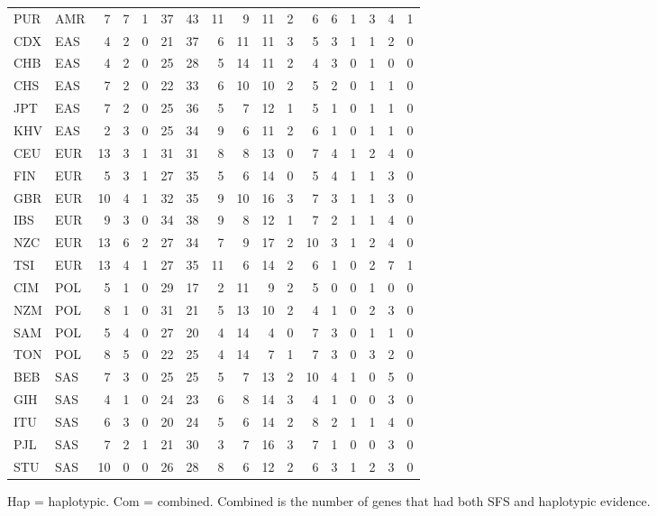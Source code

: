 \documentclass[]{report}
\begin{document}
\begin{table}[!h]
\begin{threeparttable}
\begin{tabular}[t]{llrrrrrrrrrrrrrrr}
PUR & AMR & 7 & 7 & 1 & 37 & 43 & 11 & 9 & 11 & 2 & 6 & 6 & 1 & 3 & 4 & 1\\
CDX & EAS & 4 & 2 & 0 & 21 & 37 & 6 & 11 & 11 & 3 & 5 & 3 & 1 & 1 & 2 & 0\\
CHB & EAS & 4 & 2 & 0 & 25 & 28 & 5 & 14 & 11 & 2 & 4 & 3 & 0 & 1 & 0 & 0\\
CHS & EAS & 7 & 2 & 0 & 22 & 33 & 6 & 10 & 10 & 2 & 5 & 2 & 0 & 1 & 1 & 0\\
JPT & EAS & 7 & 2 & 0 & 25 & 36 & 5 & 7 & 12 & 1 & 5 & 1 & 0 & 1 & 1 & 0\\
KHV & EAS & 2 & 3 & 0 & 25 & 34 & 9 & 6 & 11 & 2 & 6 & 1 & 0 & 1 & 1 & 0\\
CEU & EUR & 13 & 3 & 1 & 31 & 31 & 8 & 8 & 13 & 0 & 7 & 4 & 1 & 2 & 4 & 0\\
FIN & EUR & 5 & 3 & 1 & 27 & 35 & 5 & 6 & 14 & 0 & 5 & 4 & 1 & 1 & 3 & 0\\
GBR & EUR & 10 & 4 & 1 & 32 & 35 & 9 & 10 & 16 & 3 & 7 & 3 & 1 & 1 & 3 & 0\\
IBS & EUR & 9 & 3 & 0 & 34 & 38 & 9 & 8 & 12 & 1 & 7 & 2 & 1 & 1 & 4 & 0\\
NZC & EUR & 13 & 6 & 2 & 27 & 34 & 7 & 9 & 17 & 2 & 10 & 3 & 1 & 2 & 4 & 0\\
TSI & EUR & 13 & 4 & 1 & 27 & 35 & 11 & 6 & 14 & 2 & 6 & 1 & 0 & 2 & 7 & 1\\
CIM & POL & 5 & 1 & 0 & 29 & 17 & 2 & 11 & 9 & 2 & 5 & 0 & 0 & 1 & 0 & 0\\
NZM & POL & 8 & 1 & 0 & 31 & 21 & 5 & 13 & 10 & 2 & 4 & 1 & 0 & 2 & 3 & 0\\
SAM & POL & 5 & 4 & 0 & 27 & 20 & 4 & 14 & 4 & 0 & 7 & 3 & 0 & 1 & 1 & 0\\
TON & POL & 8 & 5 & 0 & 22 & 25 & 4 & 14 & 7 & 1 & 7 & 3 & 0 & 3 & 2 & 0\\
BEB & SAS & 7 & 3 & 0 & 25 & 25 & 5 & 7 & 13 & 2 & 10 & 4 & 1 & 0 & 5 & 0\\
GIH & SAS & 4 & 1 & 0 & 24 & 23 & 6 & 8 & 14 & 3 & 4 & 1 & 0 & 0 & 3 & 0\\
ITU & SAS & 6 & 3 & 0 & 20 & 24 & 5 & 6 & 14 & 2 & 8 & 2 & 1 & 1 & 4 & 0\\
PJL & SAS & 7 & 2 & 1 & 21 & 30 & 3 & 7 & 16 & 3 & 7 & 1 & 0 & 0 & 3 & 0\\
STU & SAS & 10 & 0 & 0 & 26 & 28 & 8 & 6 & 12 & 2 & 6 & 3 & 1 & 2 & 3 & 0\\
\bottomrule
\end{tabular}
\begin{tablenotes}
\item Hap = haplotypic. Com = combined. Combined is the number of genes that had both SFS and haplotypic evidence.
\end{tablenotes}
\end{threeparttable}
\end{table}
\end{document}
